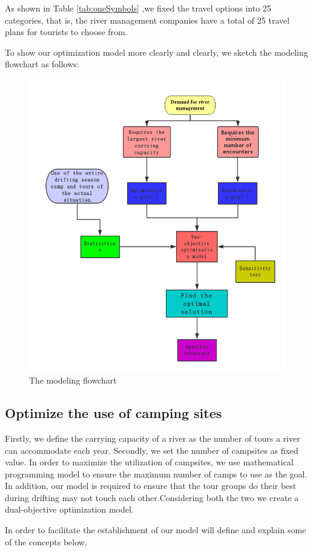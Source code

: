 As shown in Table \ref{tab:oneSymbols} ,we fixed the travel options into 25 categories, that is, the river management companies have a total of 25 travel plans for tourists to choose from.

\par To show our optimization model more clearly and clearly, we sketch the modeling flowchart as follows:
\begin{figure}[H]
	\centering
	\includegraphics[width=0.7\linewidth]{figures/flowchart}
	\caption{The modeling flowchart}
	\label{fig:flowchart}
\end{figure}

  
\subsection{Optimize the use of camping sites}
\label{subsection:5.1subsection}
\noindent 
Firstly, we define the carrying capacity of a river as the number of tours a river can accommodate each year. Secondly, we set the number of campsites as fixed value. In order to maximize the utilization of campsites, we use mathematical programming model to ensure the maximum number of camps to use as the goal. In addition, our model is required to ensure that the tour groups do their best during drifting may not touch each other.Considering both the two we create a dual-objective optimization model.
\par In order to facilitate the establishment of our model will define and explain some of the concepts below.

